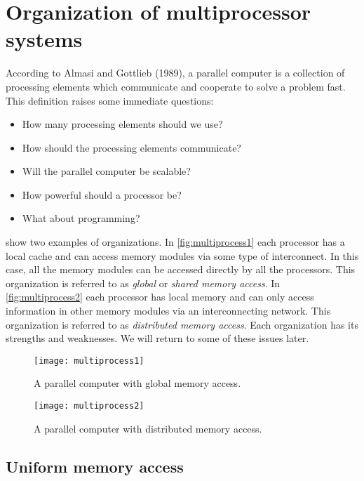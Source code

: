 \section{Organization of multiprocessor systems}

According to Almasi and Gottlieb (1989), a parallel computer is a collection of
processing elements which communicate and cooperate to solve a problem fast.
This definition raises some immediate questions:
\begin{itemize}
\item How many processing elements should we use?
\item How should the processing elements communicate?
\item Will the parallel computer be scalable?
\item How powerful should a processor be?
\item What about programming?
\end{itemize}

 show two examples of
organizations. In \autoref{fig:multiprocess1} each processor has a local cache
and can access memory modules via some type of interconnect. In this case, all
the memory modules can be accessed directly by all the processors. This
organization is referred to as \emph{global} or \emph{shared memory access}. In
\autoref{fig:multiprocess2} each processor has local memory and can only access
information in other memory modules via an interconnecting network. This
organization is referred to as \emph{distributed memory access}. Each
organization has its strengths and weaknesses. We will return to some of these
issues later.

\begin{figure}[htbp]
  \begin{center}
    \texttt{[image: multiprocess1]}
  \end{center}
  \caption{A parallel computer with global memory access.}
  \label{fig:multiprocess1}
\end{figure}

\begin{figure}[htbp]
  \begin{center}
    \texttt{[image: multiprocess2]}
  \end{center}
  \caption{A parallel computer with distributed memory access.}
  \label{fig:multiprocess2}
\end{figure}

\subsection{Uniform memory access}

